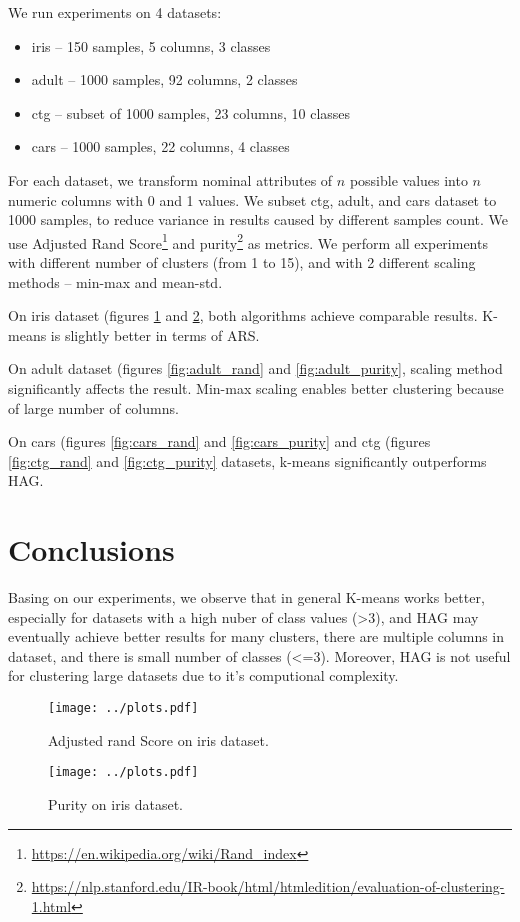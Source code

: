\documentclass[a4paper]{article}
\begin{document}
We run experiments on 4 datasets:
\begin{itemize}
\item iris -- 150 samples, 5 columns, 3 classes
\item adult -- 1000 samples, 92 columns, 2 classes
\item ctg  -- subset of 1000 samples, 23 columns, 10 classes
\item cars -- 1000 samples, 22 columns, 4 classes
\end{itemize}
For each dataset, we transform nominal attributes of $n$ possible values into $n$ numeric columns with 0 and 1 values.
We subset ctg, adult, and cars dataset to 1000 samples, to reduce variance in results caused by different samples count.
We use Adjusted Rand Score\footnote{\url{https://en.wikipedia.org/wiki/Rand_index}}
and purity\footnote{\url{https://nlp.stanford.edu/IR-book/html/htmledition/evaluation-of-clustering-1.html}} as metrics.
We perform all experiments with different number of clusters (from 1 to 15),
and with 2 different scaling methods -- min-max and mean-std.


On iris dataset (figures \ref{fig:iris_rand} and \ref{fig:iris_purity},
both algorithms achieve comparable results.
K-means is slightly better in terms of ARS.

On adult dataset (figures \ref{fig:adult_rand} and \ref{fig:adult_purity},
scaling method significantly affects the result.
Min-max scaling enables better clustering because of large number of columns.

On cars (figures \ref{fig:cars_rand} and \ref{fig:cars_purity}
and ctg (figures \ref{fig:ctg_rand} and \ref{fig:ctg_purity} datasets,
k-means significantly outperforms HAG.



\section{Conclusions}

Basing on our experiments, we observe that in general 
K-means works better, especially for datasets with a high nuber of class values (>3), and
HAG may eventually achieve better results for many clusters,
there are multiple columns in dataset, and there is small number of classes (<=3).
Moreover, HAG is not useful for clustering large datasets due to it's computional complexity.


\onecolumn

\begin{figure}[!hbt]
    \centering
    \texttt{[image: ../plots.pdf]}
    \caption[]{Adjusted rand Score on iris dataset.
    \label{fig:iris_rand}
    }
\end{figure}
\begin{figure}[!hbt]
    \centering
    \texttt{[image: ../plots.pdf]}
    \caption[]{Purity on iris dataset.
    \label{fig:iris_purity}
    }
\end{figure}
\end{document}
